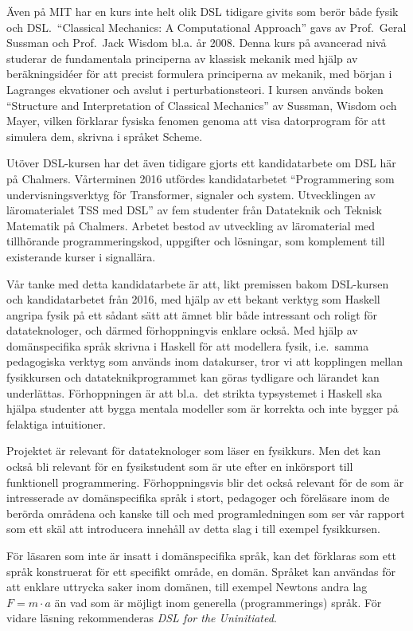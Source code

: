 \documentclass[12pt,a4paper]{article}
\begin{document}
Även på MIT har en kurs inte helt olik DSL tidigare givits som berör både fysik
och DSL.\ ``Classical Mechanics: A Computational Approach'' gavs av
Prof.\ Geral Sussman och Prof.\ Jack Wisdom bl.a. år
2008.\cite{classical-mechanics-course-mit-2008}
Denna kurs på avancerad nivå studerar de fundamentala principerna av klassisk mekanik
med hjälp av beräkningsidéer för att precist formulera principerna av
mekanik, med början i Lagranges ekvationer och avslut i
perturbationsteori. I kursen används boken ``Structure and
Interpretation of Classical Mechanics'' av Sussman, Wisdom och Mayer,
vilken förklarar fysiska fenomen genoma att visa datorprogram för att
simulera dem, skrivna i språket Scheme.\cite{SICM}

Utöver DSL-kursen har det även tidigare gjorts ett kandidatarbete om DSL
här på Chalmers. Vårterminen 2016 utfördes kandidatarbetet
``Programmering som undervisningsverktyg för Transformer, signaler och
system. Utvecklingen av läromaterialet TSS med DSL'' av fem studenter
från Datateknik och Teknisk Matematik på Chalmers. Arbetet bestod av
utveckling av läromaterial med tillhörande programmeringskod,
uppgifter och lösningar, som komplement till existerande kurser i
signallära.\cite{kandidat2016}

Vår tanke med detta kandidatarbete är att, likt premissen bakom DSL-kursen
och kandidatarbetet från 2016, med hjälp av ett bekant verktyg
som Haskell angripa fysik på ett sådant sätt att ämnet blir både
intressant och roligt för datateknologer, och därmed förhoppningvis
enklare också. Med hjälp av domänspecifika språk skrivna i Haskell för att
modellera fysik, i.e.\ samma pedagogiska verktyg som används inom
datakurser, tror vi att kopplingen mellan fysikkursen och
datateknikprogrammet kan göras tydligare och lärandet kan underlättas.
Förhoppningen är att bl.a.\ det strikta typsystemet i Haskell ska
hjälpa studenter att bygga mentala modeller som är korrekta och inte
bygger på felaktiga intuitioner.

Projektet är relevant för datateknologer som läser en fysikkurs. Men
det kan också bli relevant för en fysikstudent som är ute efter en
inkörsport till funktionell programmering. Förhoppningsvis blir det
också relevant för de som är intresserade av domänspecifika språk i
stort, pedagoger och föreläsare inom de berörda områdena och kanske
till och med programledningen som ser vår rapport som ett skäl att
introducera innehåll av detta slag i till exempel fysikkursen.

För läsaren som inte är insatt i domänspecifika språk, kan det
förklaras som ett språk konstruerat för ett specifikt område, en
domän. Språket kan användas för att enklare uttrycka saker inom
domänen, till exempel Newtons andra lag $F=m \cdot a$ än vad som är
möjligt inom generella (programmerings) språk. För vidare läsning
rekommenderas \textit{DSL for the Uninitiated}.\cite{DSLU}
\end{document}
